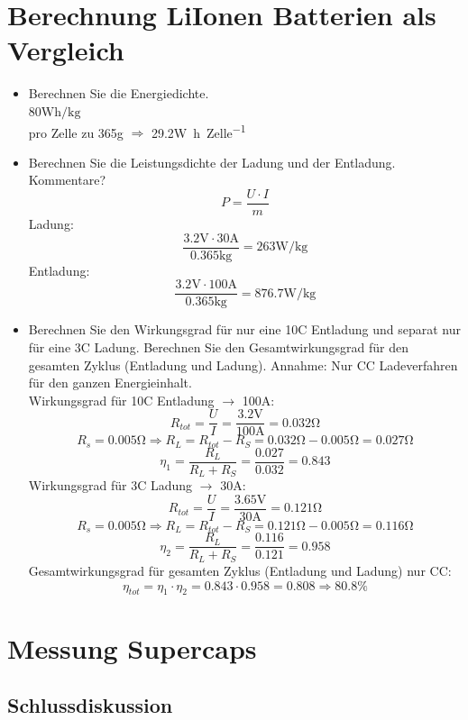 \documentclass[a4,paper,fleqn]{article}
\begin{document}
\section{Berechnung LiIonen Batterien als Vergleich}
\begin{itemize}
\item Berechnen Sie die Energiedichte. \\
    $80\si{\watt\hour\per\kilogram}$ \\
    pro Zelle zu 365\si{\gram} $\Rightarrow$ 29.2\si{\watt\hour\per Zelle}
\item Berechnen Sie die Leistungsdichte der Ladung und der Entladung. 
Kommentare? \\
    \[ P = \frac{U \cdot I}{m} \]
    Ladung: 
    \[ \frac{3.2\si{\volt} \cdot 30\si{\ampere}}{0.365\si{\kilogram}} = 263 \si{\watt\per\kilogram} \]
    Entladung: 
    \[ \frac{3.2\si{\volt} \cdot 100\si{\ampere}}{0.365\si{\kilogram}} = 876.7 \si{\watt\per\kilogram} \]
\item  Berechnen Sie den Wirkungsgrad für nur eine 10C Entladung und separat 
nur für eine 3C Ladung.  Berechnen Sie den Gesamtwirkungsgrad für den 
gesamten Zyklus (Entladung und Ladung).  Annahme: Nur CC Ladeverfahren für 
den ganzen Energieinhalt. \\
    Wirkungsgrad für 10C Entladung $\to$ 100\si{\ampere}: 
    \[ R_{tot} = \frac{U}{I} = \frac{3.2\si{\volt}}{100\si{\ampere}} 
    = 0.032\si{\ohm} \]
    \[ R_s = 0.005\si{\ohm} \Rightarrow R_L 
    = R_{tot} - R_S = 0.032\si{\ohm} - 0.005\si{\ohm} = 0.027\si{\ohm} \]
    \[ \eta_1 = \frac{R_L}{R_L + R_S} = \frac{0.027}{0.032} = 0.843 \]
    Wirkungsgrad für 3C Ladung $\to$ 30\si{\ampere}: 
    \[ R_{tot} = \frac{U}{I} = \frac{3.65\si{\volt}}{30\si{\ampere}} 
    = 0.121\si{\ohm} \]
    \[ R_s = 0.005\si{\ohm} \Rightarrow R_L 
    = R_{tot} - R_S = 0.121\si{\ohm} - 0.005\si{\ohm} = 0.116\si{\ohm} \]
    \[ \eta_2 = \frac{R_L}{R_L + R_S} = \frac{0.116}{0.121} = 0.958 \]
    Gesamtwirkungsgrad für gesamten Zyklus (Entladung und Ladung) nur CC: \\
    \[ \eta_{tot} = \eta_1 \cdot \eta_2 = 0.843 \cdot 0.958 
    = 0.808 \Rightarrow 80.8\% \]
\end{itemize}

\section{Messung Supercaps}
\subsection{Schlussdiskussion}
\end{document}
